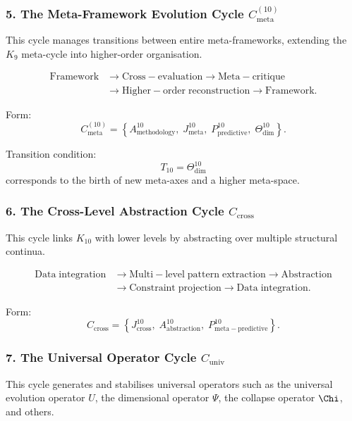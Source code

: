 \subsubsection{5. The Meta-Framework Evolution Cycle $C_{\mathrm{meta}}^{(10)}$}

This cycle manages transitions between entire meta-frameworks, extending the
$K_9$ meta-cycle into higher-order organisation.

\[
  \begin{aligned}
  \mathrm{Framework}
  &\to \mathrm{Cross\!-\!evaluation}
  \to \mathrm{Meta\!-\!critique}\\
  &\to \mathrm{Higher\!-\!order\;reconstruction}
  \to \mathrm{Framework}.
  \end{aligned}
\]

Form:
\[
  C_{\mathrm{meta}}^{(10)}
   =
   \left\{
     A^{10}_{\mathrm{methodology}},\;
     J^{10}_{\mathrm{meta}},\;
     P^{10}_{\mathrm{predictive}},\;
     \Theta^{10}_{\mathrm{dim}}
   \right\}.
\]

Transition condition:
\[
  T_{10} = \Theta^{10}_{\mathrm{dim}}
\]
corresponds to the birth of new meta-axes and a higher meta-space.


\subsubsection{6. The Cross-Level Abstraction Cycle $C_{\mathrm{cross}}$}

This cycle links $K_{10}$ with lower levels by abstracting over multiple
structural continua.

\[
  \begin{aligned}
  \mathrm{Data\;integration}
  &\to \mathrm{Multi\!-\!level\;pattern\;extraction}
  \to \mathrm{Abstraction}\\
  &\to \mathrm{Constraint\;projection}
  \to \mathrm{Data\;integration}.
  \end{aligned}
\]

Form:
\[
  C_{\mathrm{cross}}
  =
  \left\{
    J^{10}_{\mathrm{cross}},\;
    A^{10}_{\mathrm{abstraction}},\;
    P^{10}_{\mathrm{meta\!-\!predictive}}
  \right\}.
\]


\subsubsection{7. The Universal Operator Cycle $C_{\mathrm{univ}}$}

This cycle generates and stabilises universal operators such as the
universal evolution operator $U$, the dimensional operator $\Psi$, the
collapse operator $\Chi$, and others.

